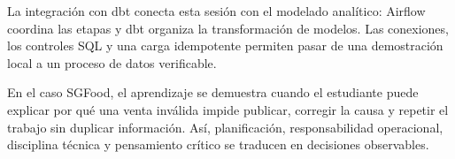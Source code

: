 \documentclass[12pt]{article}
\begin{document}
La integración con dbt conecta esta sesión con el modelado analítico: Airflow coordina las etapas y dbt organiza la transformación de modelos. Las conexiones, los controles SQL y una carga idempotente permiten pasar de una demostración local a un proceso de datos verificable.

En el caso SGFood, el aprendizaje se demuestra cuando el estudiante puede explicar por qué una venta inválida impide publicar, corregir la causa y repetir el trabajo sin duplicar información. Así, planificación, responsabilidad operacional, disciplina técnica y pensamiento crítico se traducen en decisiones observables.
\newpage
\printbibliography
\end{document}
